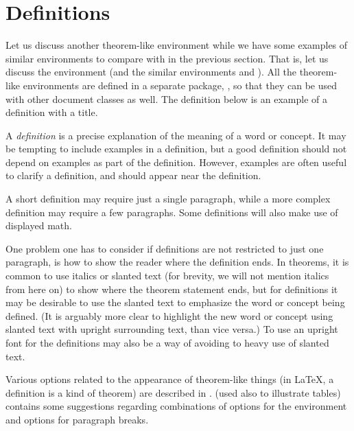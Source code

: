 \section{Definitions}

Let us discuss another theorem-like environment while we have some examples of similar environments to compare with in the previous section.  That is, let us discuss the  environment (and the similar environments  and ).  All the theorem-like environments are defined in a separate package, , so that they can be used with other document classes as well.  The definition below is an example of a definition with a title.

\begin{definition}[Definition]
  A \emph{definition} is a precise explanation of the meaning of a word or concept.  It may be tempting to include examples in a definition, but a good definition should not depend on examples as part of the definition.  However, examples are often useful to clarify a definition, and should appear near the definition.

  A short definition may require just a single paragraph, while a more complex definition may require a few paragraphs.  Some definitions will also make use of displayed math.
\end{definition}

One problem one has to consider if definitions are not restricted to just one paragraph, is how to show the reader where the definition ends.  In theorems, it is common to use italics or slanted text (for brevity, we will not mention italics from here on) to show where the theorem statement ends, but for definitions it may be desirable to use the slanted text to emphasize the word or concept being defined.  (It is arguably more clear to highlight the new word or concept using slanted text with upright surrounding text, than vice versa.)  To use an upright font for the definitions may also be a way of avoiding to heavy use of slanted text.

Various options related to the appearance of theorem-like things (in \LaTeX{}, a definition is a kind of theorem) are described in .   (used also to illustrate tables) contains some suggestions regarding combinations of options for the  environment and options for paragraph breaks.

